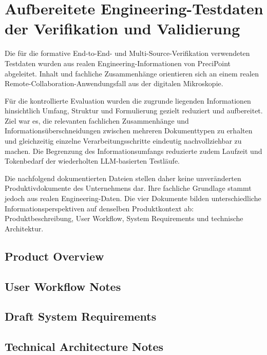 \section[Aufbereitete Engineering-Testdaten]{Aufbereitete Engineering-Testdaten der Verifikation und Validierung}
\label{app:vv_test_data}

Die für die formative End-to-End- und Multi-Source-Verifikation verwendeten
Testdaten wurden aus realen Engineering-Informationen von PreciPoint
abgeleitet. Inhalt und fachliche Zusammenhänge orientieren sich an einem
realen Remote-Collaboration-Anwendungsfall aus der digitalen Mikroskopie.

Für die kontrollierte Evaluation wurden die zugrunde liegenden Informationen
hinsichtlich Umfang, Struktur und Formulierung gezielt reduziert und
aufbereitet. Ziel war es, die relevanten fachlichen Zusammenhänge und
Informationsüberschneidungen zwischen mehreren Dokumenttypen zu erhalten und
gleichzeitig einzelne Verarbeitungsschritte eindeutig nachvollziehbar zu
machen. Die Begrenzung des Informationsumfangs reduzierte zudem Laufzeit und
Tokenbedarf der wiederholten LLM-basierten Testläufe.

Die nachfolgend dokumentierten Dateien stellen daher keine unveränderten
Produktivdokumente des Unternehmens dar. Ihre fachliche Grundlage stammt
jedoch aus realen Engineering-Daten. Die vier Dokumente bilden unterschiedliche
Informationsperspektiven auf denselben Produktkontext ab: Produktbeschreibung,
User Workflow, System Requirements und technische Architektur.

\subsection{Product Overview}



\subsection{User Workflow Notes}



\subsection{Draft System Requirements}



\subsection{Technical Architecture Notes}

